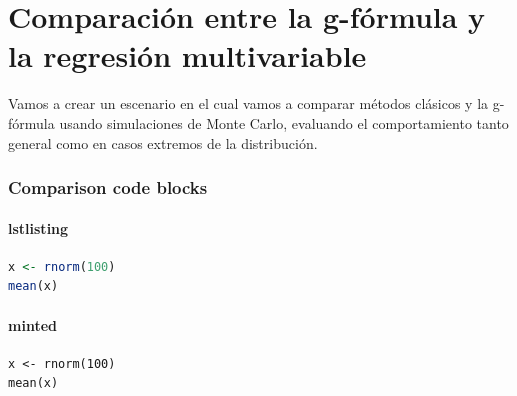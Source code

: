 \chapter{Comparación entre la g-fórmula y la regresión multivariable}

Vamos a crear un escenario en el cual vamos a comparar métodos clásicos y la g-fórmula
usando simulaciones de Monte Carlo, evaluando el comportamiento tanto general
como en casos extremos %
de la distribución.


\subsection{Comparison code blocks}
\subsubsection{lstlisting}
% 
\begin{lstlisting}[language=R]
x <- rnorm(100)
mean(x)
\end{lstlisting}

\subsubsection{minted}
\begin{verbatim}
x <- rnorm(100)
mean(x)
\end{verbatim}
